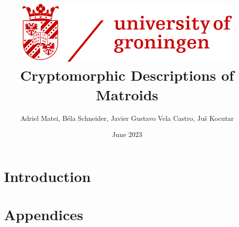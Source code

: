 \documentclass{article}
\title{ {\includegraphics[scale=0.5]{rug_logo.png}}\\
    \vspace{2cm}
    {Cryptomorphic Descriptions of Matroids} 
    }
\author{Adriel Matei, Béla Schneider, Javier Gustavo Vela Castro, Juš Kocutar}
\date{June 2023}
\theoremstyle{plain}
\theoremstyle{definition}
\theoremstyle{remark}
\numberwithin{equation}{section}
\begin{document}
\maketitle


\newpage

\tableofcontents

\newpage
\section{Introduction}












\newpage



\renewcommand{\thesubsection}{\Alph{subsection}}
\newpage
\section{Appendices}
\begin{appendices}
    \renewcommand{\theexmp}{\Alph{subsection}.\arabic{exmp}}
    
    \newpage
\end{appendices}
\end{document}
